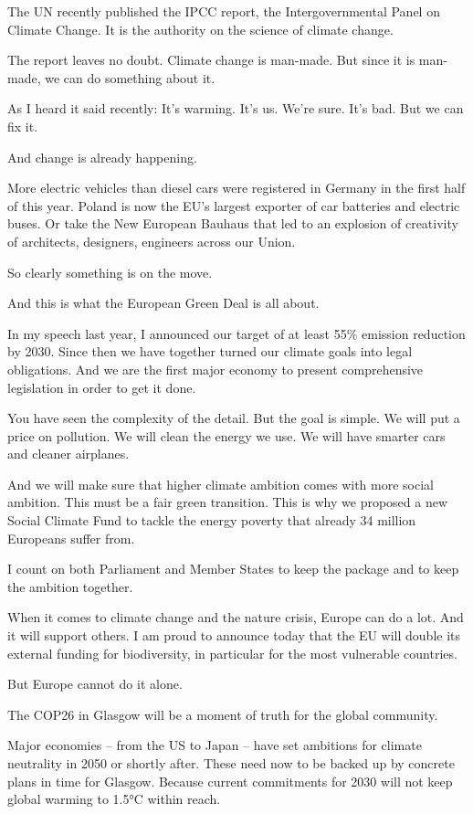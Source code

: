 \documentclass[a4paper,11pt]{article}
\begin{document}
The UN recently published the IPCC report, the Intergovernmental Panel on Climate Change. It is the authority on the science of climate change.

The report leaves no doubt. Climate change is man-made. But since it is man-made, we can do something about it.

As I heard it said recently:  It's warming. It's us. We're sure. It's bad. But we can fix it.

And change is already happening. 

More electric vehicles than diesel cars were registered in Germany in the first half of this year.  Poland is now the EU's largest exporter of car batteries and electric buses. Or take the New European Bauhaus that led to an explosion of creativity of architects, designers, engineers across our Union.

So clearly something is on the move.

And this is what the European Green Deal is all about.

In my speech last year, I announced our target of at least 55\% emission reduction by 2030.
Since then we have together turned our climate goals into legal obligations.
And we are the first major economy to present comprehensive legislation in order to get it done.

You have seen the complexity of the detail. But the goal is simple. We will put a price on pollution. We will clean the energy we use. We will have smarter cars and cleaner airplanes.

And we will make sure that higher climate ambition comes with more social ambition. This must be a fair green transition. This is why we proposed a new Social Climate Fund to tackle the energy poverty that already 34 million Europeans suffer from.

I count on both Parliament and Member States to keep the package and to keep the ambition together.

When it comes to climate change and the nature crisis, Europe can do a lot. And it will support others. I am proud to announce today that the EU will double its external funding for biodiversity, in particular for the most vulnerable countries.

But Europe cannot do it alone. 

The COP26 in Glasgow will be a moment of truth for the global community.

Major economies – from the US to Japan – have set ambitions for climate neutrality in 2050 or shortly after. These need now to be backed up by concrete plans in time for Glasgow. Because current commitments for 2030 will not keep global warming to 1.5°C within reach.
\end{document}
